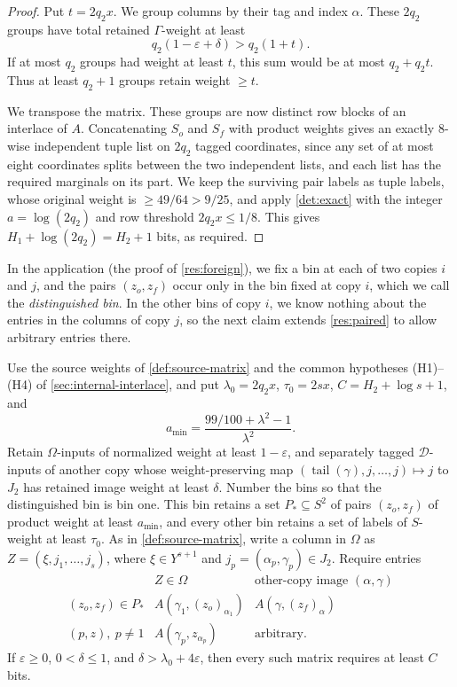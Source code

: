 \documentclass[11pt,letterpaper]{article} \usepackage[utf8]{inputenc}
\theoremstyle{plain} \newtheorem{theorem}{Theorem}[section]
\theoremstyle{definition} \newaliascnt{definition}{theorem}
\begin{document}
\begin{proof}
Put $t=2q_2x$. We group columns by their tag and index $\alpha$.
These $2q_2$ groups have total retained $\Gamma$-weight at least
\[
q_2(1-\varepsilon+\delta)>q_2(1+t).
\]
If at most $q_2$ groups had weight at least $t$, this sum would be at most
$q_2+q_2t$. Thus at least $q_2+1$ groups retain weight $\ge t$.

We transpose the matrix. These groups are now distinct row blocks of an
interlace of $A$. Concatenating $S_o$ and $S_f$ with product weights gives
an exactly $8$-wise independent tuple list on $2q_2$ tagged coordinates,
since any set of at most eight coordinates splits between the two independent
lists, and each list has the required marginals on its part. We keep the surviving pair
labels as tuple labels, whose original weight is $\ge49/64>9/25$, and
apply \cref{det:exact} with the integer $a=\log(2q_2)$ and row threshold
$2q_2x\le1/8$. This gives $H_1+\log(2q_2)=H_2+1$ bits, as required.
\end{proof}

In the application (the proof of \cref{res:foreign}), we fix a bin at each
of two copies $i$ and $j$, and the pairs $(z_o,z_f)$ occur only in the bin fixed at
copy $i$, which we call the \emph{distinguished bin}. In the other bins of copy $i$, we know
nothing about the entries in the columns of copy $j$, so the next claim
extends \cref{res:paired} to allow arbitrary entries there.

\begin{claim}\label{cl:two-stream}
Use the source weights of \cref{def:source-matrix} and the common hypotheses (H1)--(H4) of \cref{sec:internal-interlace}, and put
$\lambda_0=2q_2x$, $\tau_0=2sx$, $C=H_2+\log s+1$, and
\[
a_{\min}=\frac{99/100+\lambda^2-1}{\lambda^2}.
\]
Retain $\Omega$-inputs of normalized weight at least
$1-\varepsilon$, and separately tagged $\mathcal D$-inputs of another copy whose
weight-preserving map $(\operatorname{tail}(\gamma),j,\ldots,j)\mapsto j$ to $J_2$
has retained image weight at least $\delta$.
Number the bins so that the distinguished bin is bin one. This bin retains a set
$P_*\subseteq S^2$ of pairs $(z_o,z_f)$ of product weight at least $a_{\min}$, and every other bin retains
a set of labels of $S$-weight at least $\tau_0$. As in \cref{def:source-matrix}, write a column in $\Omega$ as
$Z=(\xi,j_1,\ldots,j_s)$, where $\xi\in Y^{s+1}$ and $j_p=(\alpha_p,\gamma_p)\in J_2$. Require entries
\[
\begin{array}{c|cc}
 & Z\in\Omega&\text{other-copy image }(\alpha,\gamma)\\ \hline
(z_o,z_f)\in P_*&A(\gamma_1,(z_o)_{\alpha_1})&A(\gamma,(z_f)_\alpha)\\
(p,z),\ p\ne1&A(\gamma_p,z_{\alpha_p})&\text{arbitrary}.
\end{array}
\]
If $\varepsilon\ge0$, $0<\delta\le1$, and $\delta>\lambda_0+4\varepsilon$, then every such matrix
requires at least $C$ bits.
\end{claim}
\end{document}
